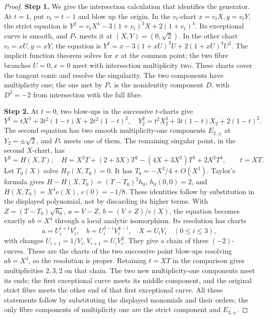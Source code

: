 \documentclass[11pt,a4paper]{article}
\theoremstyle{plain}
\theoremstyle{definition}
\begin{document}
\begin{proof}
\par\smallskip\noindent\textbf{Step 1.} We give the intersection calculation that identifies the generator. At $t=1$, put $v_t=t-1$ and blow up the origin. In the $v_t$-chart $x=v_t X,y=v_t Y$, the strict equation is
$Y^2=v_t X^3-3(1+v_t)^3X+2(1+v_t)^4$. Its exceptional curve is smooth, and $P_*$ meets it at $(X,Y)=(0,\sqrt2)$. In the other chart $v_t=xU,y=xY$, the equation is $Y^2=x-3(1+xU)^3U+2(1+xU)^4U^2$. The implicit function theorem solves for $x$ at the common point; the two fibre branches $U=0,x=0$ meet with intersection multiplicity two. These charts cover the tangent conic and resolve the singularity. The two components have multiplicity one; the one met by $P_*$ is the nonidentity component $D$, with $D^2=-2$ from intersection with the full fibre.

\par\smallskip\noindent\textbf{Step 2.} At $t=0$, two blow-ups in the successive $t$-charts give
\[
 Y^2=tX^3+3t^2(1-t)X+2t^2(1-t)^2,
\quad
 Y_2^2=t^2X_2^3+3t(1-t)X_2+2(1-t)^2.
\]
The second equation has two smooth multiplicity-one components $E_{2,\pm}$ at $Y_2=\pm\sqrt2$, and $P_*$ meets one of them. The remaining singular point, in the second $X$-chart, has
\[
 V^2=H(X,T),\quad H=X^2T+(2+3X)T^2-(4X+3X^2)T^3+2X^2T^4,
 \qquad t=XT.
\]
Let $T_0(X)$ solve $H_T(X,T_0)=0$. It has $T_0=-X^2/4+O(X^3)$. Taylor's formula gives
$H-H(X,T_0)=(T-T_0)^2h_0$, $h_0(0,0)=2$, and $H(X,T_0)=X^4e(X)$, $e(0)=-1/8$. These identities follow by substitution in the displayed polynomial, not by discarding its higher terms. With $Z=(T-T_0)\sqrt{h_0}$, $a=V-Z$, $b=(V+Z)/e(X)$, the equation becomes exactly $ab=X^4$ through a local analytic isomorphism. Its resolution has charts
\[
 a=U_i^{i+1}V_i^i,\quad b=U_i^{3-i}V_i^{4-i},\quad X=U_iV_i
 \quad(0\le i\le3),
\]
with changes $U_{i+1}=1/V_i,V_{i+1}=U_iV_i^2$. They give a chain of three $(-2)$-curves. These are the charts of the two successive point blow-ups resolving $ab=X^4$, so the resolution is proper. Retaining $t=XT$ in the comparison gives multiplicities $2,3,2$ on that chain. The two new multiplicity-one components meet its ends; the first exceptional curve meets its middle component, and the original strict fibre meets the other end of that first exceptional curve. All these statements follow by substituting the displayed monomials and their orders; the only fibre components of multiplicity one are the strict component and $E_{2,\pm}$.


\end{proof}
\end{document}
